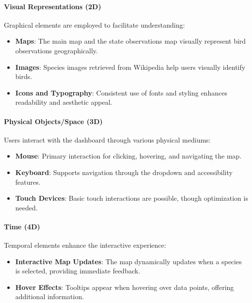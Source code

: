 \paragraph{Visual Representations (2D)}

Graphical elements are employed to facilitate understanding:

\begin{itemize} 
    \item \textbf{Maps}: The main map and the state observations map visually represent bird observations geographically. 
    \item \textbf{Images}: Species images retrieved from Wikipedia help users visually identify birds. 
    \item \textbf{Icons and Typography}: Consistent use of fonts and styling enhances readability and aesthetic appeal. 
\end{itemize}

\paragraph{Physical Objects/Space (3D)}

Users interact with the dashboard through various physical mediums:

\begin{itemize} 
    \item \textbf{Mouse}: Primary interaction for clicking, hovering, and navigating the map. 
    \item \textbf{Keyboard}: Supports navigation through the dropdown and accessibility features. 
    \item \textbf{Touch Devices}: Basic touch interactions are possible, though optimization is needed. 
\end{itemize}

\paragraph{Time (4D)}

Temporal elements enhance the interactive experience:

\begin{itemize} 
    \item \textbf{Interactive Map Updates}: The map dynamically updates when a species is selected, providing immediate feedback. 
    \item \textbf{Hover Effects}: Tooltips appear when hovering over data points, offering additional information. 
\end{itemize}

